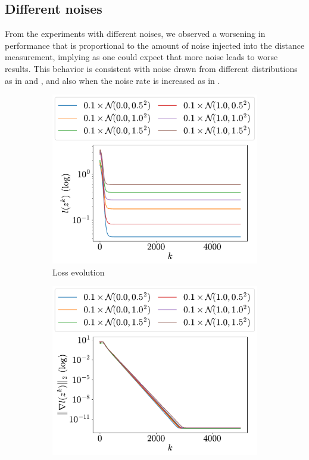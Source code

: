 \documentclass[a4paper,11pt,oneside]{book}
\begin{document}
\subsection{Different noises}

From the experiments with different noises, we observed a worsening in performance that is proportional to the amount of noise injected into the distance measurement, implying as one could expect that more noise leads to worse results. This behavior is consistent with noise drawn from different distributions as in  and , and also when the noise rate is increased as in .

\begin{figure}[H]
      \centering
      \begin{subfigure}[t]{0.46\linewidth}
            \centering
            \includegraphics[width=\linewidth]{./figs/tracking/gaussian/loss.pdf} 
            \caption{Loss evolution}
      \end{subfigure}
      \hfill
      \begin{subfigure}[t]{0.46\linewidth}
            \centering
            \includegraphics[width=\linewidth]{./figs/tracking/gaussian/gradient.pdf} 

\end{subfigure}
\end{figure}
\end{document}

